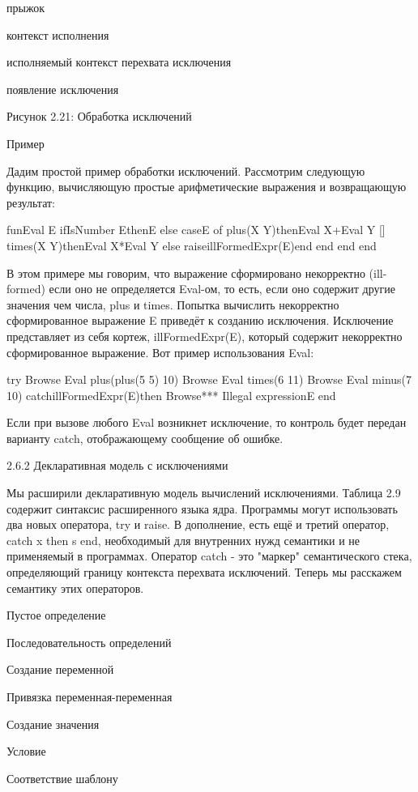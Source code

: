 прыжок

контекст исполнения

исполняемый контекст перехвата исключения

появление исключения

Рисунок 2.21: Обработка исключений

Пример

Дадим простой пример обработки исключений. Рассмотрим следующую функцию, вычисляющую простые арифметические выражения и возвращающую результат:

fun{Eval E}
if{IsNumber E}thenE
else
caseE
of plus(X Y)then{Eval X}+{Eval Y}
[] times(X Y)then{Eval X}*{Eval Y}
else raiseillFormedExpr(E)end
end
end
end

В этом примере мы говорим, что выражение сформировано некорректно (ill-formed) если оно не определяется Eval-ом, то есть, если оно содержит другие значения чем числа, plus и times. Попытка вычислить некорректно сформированное выражение E приведёт к созданию исключения. Исключение представляет из себя кортеж, illFormedExpr(E), который содержит некорректно сформированное выражение. Вот пример использования Eval:

try
{Browse {Eval plus(plus(5 5) 10)}}
{Browse {Eval times(6 11)}}
{Browse {Eval minus(7 10)}}
catchillFormedExpr(E)then
{Browse*** Illegal expressionE}
end

Если при вызове любого Eval возникнет исключение, то контроль будет передан варианту catch, отображающему сообщение об ошибке.

2.6.2 Декларативная модель с исключениями

Мы расширили декларативную модель вычислений исключениями. Таблица 2.9 содержит синтаксис расширенного языка ядра. Программы могут использовать два новых оператора, try и raise. В дополнение, есть ещё и третий оператор, catch x then s end, необходимый для внутренних нужд семантики и не применяемый в программах. Оператор catch - это "маркер" семантического стека, определяющий границу контекста перехвата исключений. Теперь мы расскажем семантику этих операторов.

Пустое определение

Последовательность определений

Создание переменной

Привязка переменная-переменная

Создание значения

Условие

Соответствие шаблону

